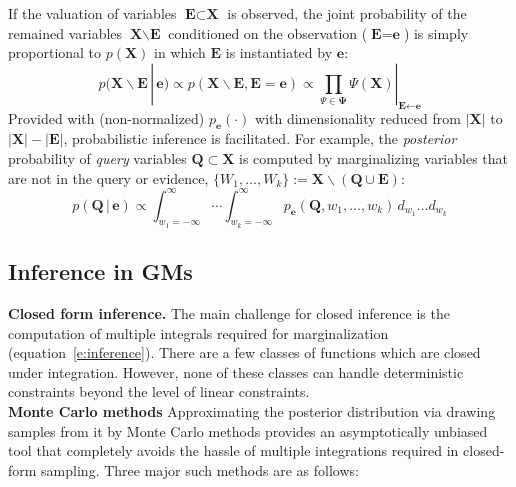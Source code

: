 \documentclass{article}
\renewcommand{\vec}[1]{\mathbf{#1}}
\newcommand{\bvec}[1]{\textbf{#1}}
\newcommand{\pr}{p}
\begin{document}
If the valuation of variables $\bvec{E} \subset \bvec{X}$ is observed,
the joint probability of the remained variables $\bvec{X} \backslash \bvec{E}$ conditioned on the observation ($\bvec{E} = \bvec{e}$) is simply proportional to $\pr(\bvec{X})$ in which $\bvec{E}$ is instantiated by $\bvec{e}$:
\begin{equation}
\label{e:posterior-joint}
\pr(\bvec{X} \backslash \bvec{E} \,|\, \bvec{e}) \propto 
\pr(\bvec{X} \backslash \bvec{E}, \bvec{E} = \bvec{e}) \propto
\prod_{\Psi \in \boldsymbol\Psi} \Psi (\vec{X})|_{\bvec{E} \leftarrow \bvec{e}}
\end{equation}
Provided with (non-normalized) $\pr_{\bvec{e}}(\cdot)$ with dimensionality reduced from $|\bvec{X}|$ to $|\bvec{X}| - |\bvec{E}|$, probabilistic inference is facilitated. 
For example, 
the \emph{posterior} probability of \emph{query} variables $\vec{Q} \subset \vec{X}$ 
is computed by marginalizing variables that are not in the query or evidence,
$\{W_1, \ldots, W_k\} := \vec{X} \backslash (\vec{Q} \cup \vec{E})$:
\begin{equation}
\label{e:inference}
\pr(\vec{Q} \,|\, \vec{e}) \propto 
\int_{w_1 = -\infty}^{\infty} \!\!\!\!\!\! \cdots \int_{w_k = -\infty}^{\infty}
\!\!\!\!\!\!\!\! \pr_{\bvec{e}}(\bvec{Q}, w_1, \ldots, w_k )
\, d_{w_1} \ldots d_{w_k}
\end{equation}
\subsection{Inference in GMs}
\textbf{Closed form inference.}
The main challenge for closed inference is the computation of multiple integrals required for marginalization (equation~\ref{e:inference}).
There are a few classes of functions which are closed under integration.
However, none of these classes can handle deterministic constraints beyond the level of linear constraints.
\\
\textbf{Monte Carlo methods}
Approximating the posterior distribution via drawing samples from it by Monte Carlo methods 
provides an asymptotically unbiased tool that completely avoids the hassle of multiple integrations required in closed-form sampling.   
Three major such methods are as follows:
\end{document}
